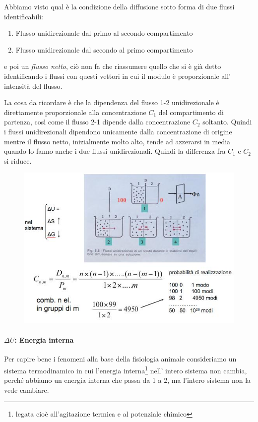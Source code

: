 \documentclass[a4paper,12pt]{article}
\begin{document}
Abbiamo visto qual è la condizione della diffusione sotto forma di due flussi identificabili: 
\begin{enumerate}
\item{Flusso unidirezionale dal primo al secondo compartimento}
\item{Flusso unidirezionale dal secondo al primo compartimento}
\end{enumerate}

e poi un \emph{flusso netto}, ciò non fa che riassumere quello che si è già detto identificando i flussi con questi vettori in cui il modulo è proporzionale all' intensità del flusso.

La cosa da ricordare è che la dipendenza del flusso 1-2 unidirezionale è direttamente proporzionale alla concentrazione $C_{1}$ del compartimento di partenza, così come il flusso 2-1 dipende dalla concentrazione $C_{2}$ soltanto.
Quindi i flussi unidirezionali dipendono unicamente dalla concentrazione di origine mentre il flusso netto,  inizialmente molto alto, tende ad azzerarsi in media quando lo fanno anche i due flussi unidirezionali. Quindi la differenza fra $C_{1}$ e $C_{2}$ si riduce.

\begin{figure}[H]
\centering
\includegraphics[scale=0.4]{immagine/combinatorio.jpg}
\caption{}
\label{img:comb}
\end{figure}


\paragraph{$\Delta U$: Energia interna}
Per capire bene i fenomeni alla base della fisiologia animale consideriamo un sistema termodinamico in cui l'energia interna\footnote{legata cioè all'agitazione termica e al potenziale chimico} nell' intero sistema non cambia, perché abbiamo un energia interna che passa da 1 a 2, ma l'intero sistema non la vede cambiare.
\end{document}
